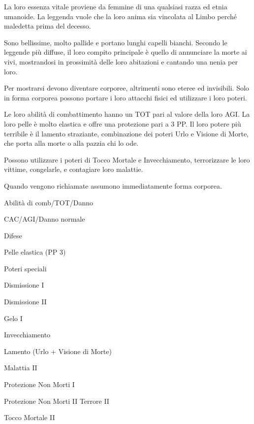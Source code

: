 La loro essenza vitale proviene da femmine di una qualsiasi razza ed
etnia umanoide. La leggenda vuole che la loro anima sia vincolata al
Limbo perch\'e maledetta prima del decesso.


Sono bellissime, molto pallide e portano lunghi capelli bianchi.
Secondo le leggende pi\`u diffuse, il loro compito principale \`e
quello di annunciare la morte ai vivi, mostrandosi in prossimit\`a
delle loro abitazioni e cantando una nenia per loro.

Per mostrarsi devono diventare corporee, altrimenti sono eteree ed
invisibili. Solo in forma corporea possono portare i loro attacchi
fisici ed utilizzare i loro poteri.

Le loro abilit\`a di combattimento hanno un TOT pari al valore della
loro AGI. La loro pelle \`e molto elastica e offre una protezione
pari a 3 PP. Il loro potere pi\`u terribile \`e il lamento
straziante, combinazione dei poteri Urlo e Visione di Morte, che porta
alla morte o alla pazzia chi lo ode.

Possono utilizzare i poteri di Tocco Mortale e Invecchiamento,
terrorizzare le loro vittime, congelarle, e contagiare loro malattie.

Quando vengono richiamate assumono immediatamente forma corporea.


\begin{parmostro}{Abilit\`a di comb/TOT/Danno}
\item CAC/AGI/Danno normale
\end{parmostro}

\begin{parmostro}{Difese}
\item Pelle elastica (PP 3)
\end{parmostro}

\begin{parmostro}{Poteri speciali}
\item Dismissione I
\item Dismissione II
\item Gelo I
\item Invecchiamento
\item Lamento (Urlo + Visione di Morte)
\item Malattia II
\item Protezione Non Morti I
\item Protezione Non Morti II Terrore II
\item Tocco Mortale II
\end{parmostro}

